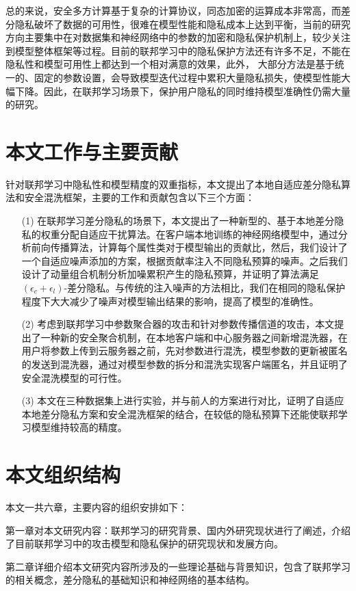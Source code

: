 总的来说，安全多方计算基于复杂的计算协议，同态加密的运算成本非常高，而差分隐私破坏了数据的可用性，很难在模型性能和隐私成本上达到平衡，当前的研究方向主要集中在对数据集和神经网络中的参数的加密和隐私保护机制上，较少关注到模型整体框架等过程。目前的联邦学习中的隐私保护方法还有许多不足，不能在隐私性和模型可用性上都达到一个相对满意的效果，此外， 大部分方法是基于统一的、固定的参数设置，会导致模型迭代过程中累积大量隐私损失，使模型性能大幅下降。因此，在联邦学习场景下，保护用户隐私的同时维持模型准确性仍需大量的研究。

\section{本文工作与主要贡献}
针对联邦学习中隐私性和模型精度的双重指标，本文提出了本地自适应差分隐私算法和安全混洗框架，主要的工作和贡献包含以下三个方面：
\begin{enumerate}
\item [(1)] 在联邦学习差分隐私的场景下，本文提出了一种新型的、基于本地差分隐私的权重分配自适应干扰算法。在客户端本地训练的神经网络模型中，通过分析前向传播算法，计算每个属性类对于模型输出的贡献比，然后，我们设计了一个自适应噪声添加的方案，根据贡献率注入不同隐私预算的噪声。之后我们设计了动量组合机制分析加噪累积产生的隐私预算，并证明了算法满足$\left(\epsilon_{c}+\epsilon_{l}\right)$-差分隐私。与传统的注入噪声的方法相比，我们在相同的隐私保护程度下大大减少了噪声对模型输出结果的影响，提高了模型的准确性。
\item [(2)] 考虑到联邦学习中参数聚合器的攻击和针对参数传播信道的攻击，本文提出了一种新的安全聚合机制，在本地客户端和中心服务器之间新增混洗器，在用户将参数上传到云服务器之前，先对参数进行混洗，模型参数的更新被匿名的发送到混洗器，通过对模型参数的拆分和混洗实现客户端匿名，并且证明了安全混洗模型的可行性。
\item [(3)] 本文在三种数据集上进行实验，并与前人的方案进行对比，证明了自适应本地差分隐私方案和安全混洗框架的结合，在较低的隐私预算下还能使联邦学习模型维持较高的精度。
\end{enumerate}

\section{本文组织结构}

本文一共六章，主要内容的组织安排如下：

第一章对本文研究内容：联邦学习的研究背景、国内外研究现状进行了阐述，介绍了目前联邦学习中的攻击模型和隐私保护的研究现状和发展方向。

第二章详细介绍本文研究内容所涉及的一些理论基础与背景知识，包含了联邦学习的相关概念，差分隐私的基础知识和神经网络的基本结构。

